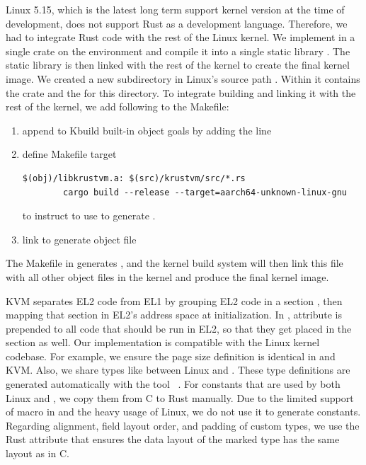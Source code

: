 Linux 5.15, which is the latest long term support kernel version at the time of
\rustsec{} development, does not support Rust as a development language.
Therefore, we had to integrate Rust code with the rest of the Linux kernel.
We implement \rustcore{} in a single crate on the  environment
and compile it into a single static library .
The static library is then linked
with the rest of the kernel to create the final kernel image.
We created a new subdirectory in Linux's source path .
Within it contains the \rustcore{} crate and the  for this
directory. To integrate building  and linking it with the
rest of the kernel, we add following to the Makefile:
\begin{enumerate}
\item{append  to Kbuild built-in object goals  by adding the line }
\item{define Makefile target
\begin{listing}[hbtp]
    \begin{verbatim}
$(obj)/libkrustvm.a: $(src)/krustvm/src/*.rs
        cargo build --release --target=aarch64-unknown-linux-gnu
    \end{verbatim}
    \label{lst:Makefile}
    \vspace{-1.2cm}
\end{listing}
to instruct  to use  to generate .
}
\item{link  to generate object file }
\end{enumerate}
The Makefile in  generates ,
and the kernel build system will then link this file with all other object
files in the kernel and produce the final kernel image.

KVM separates EL2 code from EL1 by grouping EL2 code in a section
, then mapping that section in EL2's address space at
initialization.
In \rustcore{}, attribute \code{\#[link\_section = ".hyp.text"]} is prepended
to all code that should be run in EL2, so that they get placed in the
 section as well.
Our implementation is compatible with the Linux kernel codebase. For example, we
ensure the page size definition is identical in \rustcore{} and KVM.
Also, we share types like  between Linux and \rustcore{}.
These type definitions are generated automatically
with the tool ~\cite{bindgen}.
For constants that are used by both Linux and \rustcore{},
we copy them from C to Rust manually.
Due to the limited support of macro in 
and the heavy usage of Linux,
we do not use it to generate constants.
Regarding alignment, field layout order, and padding of custom types,
we use the Rust attribute \code{\#[repr\-(C)]}
that ensures the data layout of the marked type has the same layout as in C.

